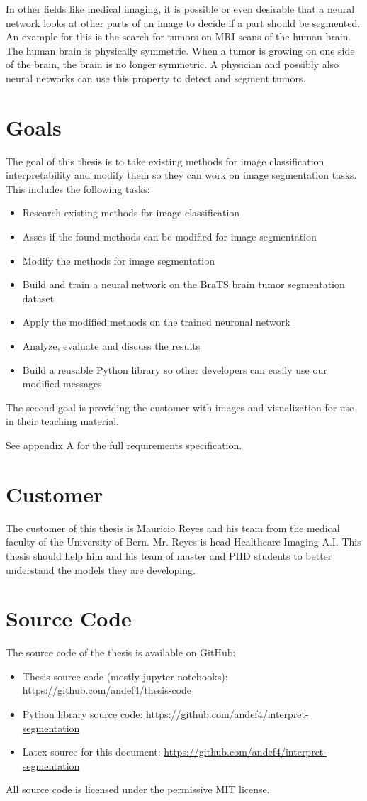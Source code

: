 In other fields like medical imaging, it is possible or even desirable that a neural network looks at other parts of an image to decide if a part should be segmented. An example for this is the search for tumors on MRI scans of the human brain. The human brain is physically symmetric. When a tumor is growing on one side of the brain, the brain is no longer symmetric. A physician and possibly also neural networks can use this property to detect and segment tumors.

\section{Goals}
The goal of this thesis is to take existing methods for image classification interpretability and modify them so they can work on image segmentation tasks. This includes the following tasks:
\begin{itemize}
    \item Research existing methods for image classification
    \item Asses if the found methods can be modified for image segmentation
    \item Modify the methods for image segmentation
    \item Build and train a neural network on the BraTS brain tumor segmentation dataset
    \item Apply the modified methods on the trained neuronal network
    \item Analyze, evaluate and discuss the results
    \item Build a reusable Python library so other developers can easily use our modified messages
\end{itemize}

The second goal is providing the customer with images and visualization for use in their teaching material.

See appendix A for the full requirements specification.

\section{Customer}
The customer of this thesis is Mauricio Reyes and his team from the medical faculty of the University of Bern. Mr. Reyes is head Healthcare Imaging A.I. This thesis should help him and his team of master and PHD students to better understand the models they are developing.

\section{Source Code}
The source code of the thesis is available on GitHub:
\begin{itemize}
    \item Thesis source code (mostly jupyter notebooks): \url{https://github.com/andef4/thesis-code}
    \item Python library source code: \url{https://github.com/andef4/interpret-segmentation}
    \item Latex source for this document: \url{https://github.com/andef4/interpret-segmentation}
\end{itemize}

All source code is licensed under the permissive MIT license.
